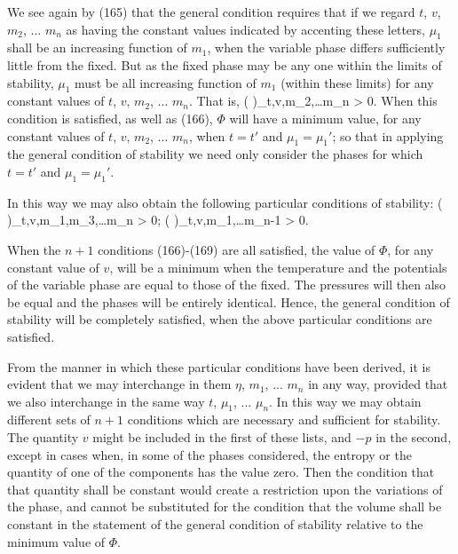 \documentclass[12pt]{memoir}
\begin{document}
We see again by (165) that the general condition requires that if we regard $t$, $v$, $m_2$, ... $m_n$ as having the constant values indicated by accenting these letters, $\mu_1$ shall be an increasing function of $m_1$, when the variable phase differs sufficiently little from the fixed. But as the fixed phase may be any one within the limits of stability, $\mu_1$ must be all increasing function of $m_1$ (within these limits) for any constant values of $t$, $v$, $m_2$, ... $m_n$. That is,
\eqs \left(  \right)_{t,v,m_2,\dots m_n} > 0.\label{167}\eqe
When this condition is satisfied, as well as (166), $\Phi$ will have a minimum value, for any constant values of $t$, $v$, $m_2$, ... $m_n$, when $t =t'$ and $\mu_1 = \mu_1'$; so that in applying the general condition of stability we need only consider the phases for which $t =t'$ and $\mu_1 = \mu_1'$.


In this way we may also obtain the following particular conditions of stability:
\eqs \left(  \right)_{t,v,m_1,m_3,\dots m_n} > 0;  \label{168}\eqe
\eqs \left(  \right)_{t,v,m_1,\dots m_{n-1}} > 0. \label{169}\eqe


When the $n+1$ conditions (166)-(169) are all satisfied, the value of $\Phi$, for any constant value of $v$, will be a minimum when the temperature and the potentials of the variable phase are equal to those of the fixed. The pressures will then also be equal and the phases will be entirely identical. Hence, the general condition of stability will be completely satisfied, when the above particular conditions are satisfied.


From the manner in which these particular conditions have been derived, it is evident that we may interchange in them $\eta$, $m_1$, ... $m_n$ in any way, provided that we also interchange in the same way $t$, $\mu_1$, ... $\mu_n$.  In this way we may obtain different sets of $n + 1$ conditions which are necessary and sufficient for stability.  The quantity $v$ might be included in the first of these lists, and $-p$ in the second, except in cases when, in some of the phases considered, the entropy or the quantity of one of the components has the value zero. Then the condition that that quantity shall be constant would create a restriction upon the variations of the phase, and cannot be substituted for the condition that the volume shall be constant in the statement of the general condition of stability relative to the minimum value of $\Phi$.
\end{document}
